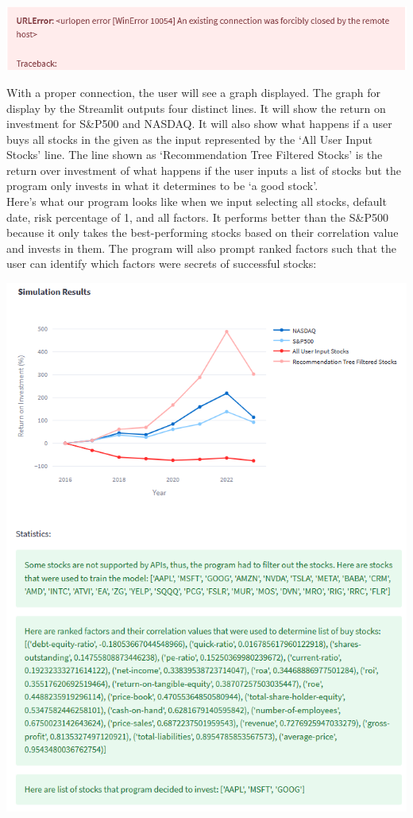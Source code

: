 \documentclass[fontsize=11pt]{article}
\begin{document}
\begin{center}
\includegraphics[scale=0.65]{error.png}
\end{center}
With a proper connection, the user will see a graph displayed. The graph for display by the Streamlit outputs four distinct lines. It will show the return on investment for S\&P500 and NASDAQ. It will also show what happens if a user buys all stocks in the given as the input represented by the `All User Input Stocks' line. The line shown as `Recommendation Tree Filtered Stocks' is the return over investment of what happens if the user inputs a list of stocks but the program only invests in what it determines to be `a good stock'.\\

Here's what our program looks like when we input selecting all stocks, default date, risk percentage of 1, and all factors. It performs better than the S\&P500 because it only takes the best-performing stocks based on their correlation value and invests in them. The program will also prompt ranked factors such that the user can identify which factors were secrets of successful stocks:

\begin{center}
\includegraphics[scale=1]{visualization.png}
\end{center}
\end{document}
